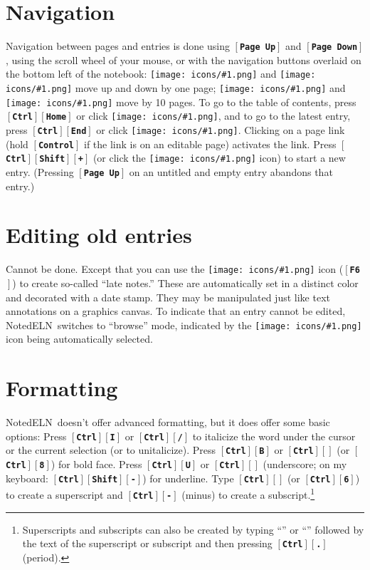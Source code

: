 \documentclass[11pt]{report}
\def\keystroke#1{$\left[\right.\!${\tt\bfseries #1}$\!\left.\right]$}
\def\key#1{\keystroke{#1}}
\def\keycombo#1#2{\keystroke{#1}\keystroke{#2}}
\def\keycontrol#1{\keycombo{Ctrl}{#1}}
\def\controlshift#1{\keystroke{Ctrl}\keystroke{Shift}\keystroke{#1}}
\def\keyctrlhat{\keycontrol{\char94}}
\def\keyhat{``{\tt\char94}''}
\def\keyctrlunderscore{\keycontrol{\char95}}
\def\keyunderscore{``{\tt\char95}''}
\def\icon#1{\raise-2pt\hbox{\texttt{[image: icons/\#1.png]}}}
\newcommand{\NotedELN}{NotedELN} %
\begin{document}
\section{Navigation}

Navigation between pages and entries is done using \key{Page Up} and
\key{Page Down}, using the scroll wheel of your mouse, or with the
navigation buttons overlaid on the bottom left of the notebook:
\icon{nav-prev} and \icon{nav-next} move up and down by one page;
\icon{nav-p10} and \icon{nav-n10} move by 10 pages. To go
to the table of contents, press \keycontrol{Home} or click
\icon{nav-toc}, and to go to the latest entry, press \keycontrol{End}
or click \icon{nav-end}. Clicking on a page link (hold \key{Control}
if the link is on an editable page) activates the link. Press
\controlshift{+} (or click the \icon{nav-plus} icon) to start a new
entry. (Pressing
\key{Page Up} on an untitled and empty  entry  abandons that
entry.)

\section{Editing old entries}

Cannot be done. Except that you can use the \icon{note} icon (\key{F6}) to
create so-called ``late notes.'' These are automatically set in a
distinct color and decorated with a date stamp. They
may be manipulated just like text annotations on a graphics canvas. To
indicate that an entry cannot be edited, \NotedELN\ switches to ``browse''
mode, indicated by the \icon{browse} icon being automatically selected.

\section{Formatting}

\NotedELN\ doesn't offer advanced formatting, but it does offer some basic
options: Press \keycontrol{I} or \keycontrol{/} to italicize the word
under the cursor or the current selection (or to unitalicize). Press
\keycontrol{B} or \keycontrol{*} (or \keycontrol{8}) for bold face. Press
\keycontrol{U} or \keyctrlunderscore{} (underscore; on my keyboard: \controlshift{-})
for underline. Type \keyctrlhat{} (or \keycontrol{6}) to create a
superscript and \keycontrol{-} (minus) to create a
subscript.\footnote{Superscripts and subscripts can also be created by
  typing \keyhat{} or \keyunderscore{} followed by the text of the
  superscript or subscript and then pressing \keycontrol{.} (period).}
\end{document}
